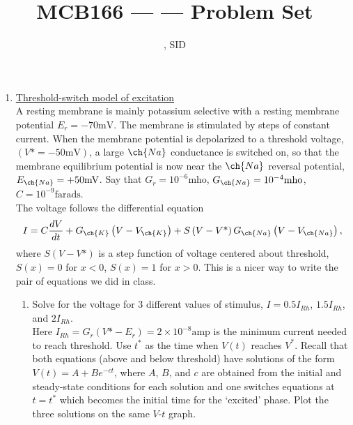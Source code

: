 \documentclass[11pt]{article}
\title{MCB166 --- \Session --- Problem Set \Homework}
\author{\Name, SID \SID}
\date{}
\begin{document}
\maketitle

\newpage
\begin{enumerate}[label=\arabic*.]
\item
\underline{Threshold-switch model of excitation}
\vspace*{1\baselineskip}
\\
A resting membrane is mainly potassium selective with a resting membrane potential $E_r = -70 \text{mV}$. The membrane is stimulated by steps of constant current. When the membrane potential is depolarized to a threshold voltage, $\left(V\text{*} = -50 \text{mV}\right)$, a large $\ch{Na}$ conductance is switched on, so that the membrane equilibrium potential is now near the $\ch{Na}$ reversal potential, $E_{\ch{Na}} = +50\text{mV}$. Say that $G_r = 10^{-6} \text{mho}$, $G_{\ch{Na}} = 10^{-4} \text{mho}$, $C = 10^{-9} \text{farads}$.
\vspace*{1\baselineskip}
\\
The voltage follows the differential equation
\begin{align*}
I = C \frac{dV} {dt} + G_{\ch{K}} \left(V - V_{\ch{K}}\right) + S \left(V - V\text{*}\right) G_{\ch{Na}} \left(V - V_{\ch{Na}}\right),
\end{align*}
where $S \left(V - V\text{*}\right)$ is a step function of voltage centered about threshold, $S(x) = 0$ for $x < 0$, $S(x) = 1$ for $x > 0$. This is a nicer way to write the pair of equations we did in class.
\begin{enumerate}[label=(\alph*)]
\item
Solve for the voltage for $3$ different values of stimulus, $I = 0.5 I_{Rh}$, $1.5 I_{Rh}$, and $2 I_{Rh}$.
\vspace*{1\baselineskip}
\\
Here $I_{Rh} = G_r \left(V\text{*} - E_r\right) = 2 \times 10^{-8} \text{amp}$ is the minimum current needed to reach threshold. Use $t^{\text{*}}$ as the time when $V(t)$ reaches $V^{\text{*}}$. Recall that both equations (above and below threshold) have solutions of the form $V(t) = A + B e^{-ct}$, where $A$, $B$, and $c$ are obtained from the initial and steady-state conditions for each solution and one switches equations at $t = t^{\text{*}}$ which becomes the initial time for the `excited' phase. Plot the three solutions on the same $V$-$t$ graph.
\vspace*{1\baselineskip}

\end{enumerate}
\end{enumerate}
\end{document}
